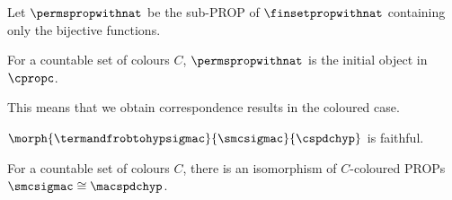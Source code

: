 \begin{lemma}
    Let \(\permspropwithnat\) be the sub-PROP of \(\finsetpropwithnat\)
    containing only the bijective functions.
\end{lemma}

\begin{lemma}
    For a countable set of colours \(C\), \(\permspropwithnat\) is the initial
    object in \(\cpropc\).
\end{lemma}

This means that we obtain correspondence results in the coloured case.

\begin{proposition}
    \(\morph{\termandfrobtohypsigmac}{\smcsigmac}{\cspdchyp}\) is faithful.
\end{proposition}

\begin{corollary}
    For a countable set of colours \(C\), there is an isomorphism of
    \(C\)-coloured PROPs \(\smcsigmac \cong \macspdchyp\).
\end{corollary}